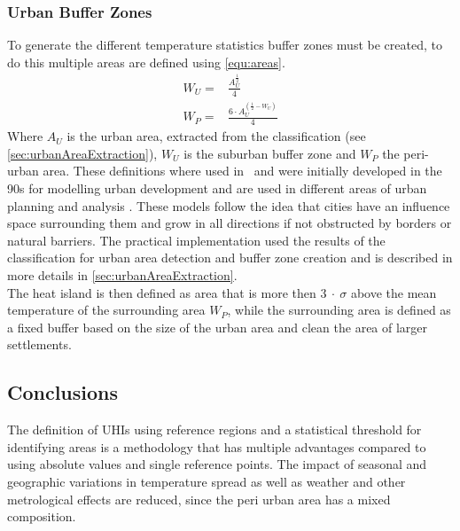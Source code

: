 \documentclass[12pt,a4paper, english,twoside]{article}
\begin{document}
    \subsubsection{Urban Buffer Zones}\label{sec:urbanBufferzone}
      To generate the different temperature statistics buffer zones must be created, to do this multiple areas are defined using \cref{equ:areas}.
      \begin{equation}\label{equ:areas}
        \begin{split}
          W_U = & \frac{A_U^{\frac{1}{2}}}{4} \\
          W_P = & \frac{6\cdot A_U^{(\frac{1}{2}-W_U)}}{4}
        \end{split}
      \end{equation}
      Where $A_U$ is the urban area, extracted from the classification (see \cref{sec:urbanAreaExtraction}), $W_U$ is the suburban buffer zone and $W_P$ the peri-urban area.
      These definitions where used in~\cite{Sobrino2020} and were initially developed in the 90s for modelling urban development and are used in different areas of urban planning and analysis \autocite[see]{AlkanBala2014}.
      These models follow the idea that cities have an influence space surrounding them and grow in all directions if not obstructed by borders or natural barriers. 
      The practical implementation used the results of the classification for urban area detection and buffer zone creation and is described in more details in \cref{sec:urbanAreaExtraction}. \\
      The heat island is then defined as area that is more then $3~\cdot~\sigma$ above the mean temperature of the surrounding area $W_P$, while the surrounding area is defined as a fixed buffer based on the size of the urban area and clean the area of larger settlements. 
    \subsection{Conclusions}
    The definition of \glspl{UHI} using reference regions and a statistical threshold for identifying areas is a methodology that has multiple advantages compared to using absolute values and single reference points. 
    The impact of seasonal and geographic variations in temperature spread as well as weather and other metrological effects are reduced, since the peri urban area has a mixed composition. 

\newpage
\end{document}

